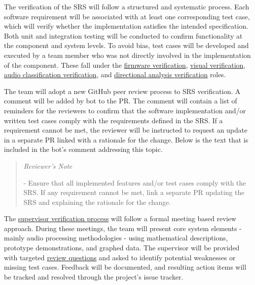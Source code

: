 \documentclass[12pt, titlepage]{article}
\newenvironment{shadedquotation}
    {\begin{quote}\itshape} {\end{quote}}
\begin{document}
The verification of the SRS will follow a structured and systematic process.
Each software requirement will be associated with at least one corresponding
test case, which will verify whether the implementation satisfies the intended
specification. Both unit and integration testing will be conducted to confirm
functionality at the component and system levels. To avoid bias, test cases will
be developed and executed by a team member who was not directly involved in the
implementation of the component. These fall under the
\hyperref[role:firmware_verfication]{firmware verification},
\hyperref[role:visual_vnv]{visual verification},
\hyperref[role:classification_verfication]{audio classification verification},
and
\hyperref[role:directional_verfication]{directional analysis verification}
roles. \newline

The team will adopt a new GitHub peer review process to SRS verification. A
comment will be added by bot to the PR. The comment will contain a list of
reminders for the reviewers to confirm that the software implementation and/or
written test cases comply with the requirements defined in the SRS. If a
requirement cannot be met, the reviewer will be instructed to request an update
in a separate PR linked with a rationale for the change. Below is the text that
is included in the bot's comment addressing this topic. \newline

\begin{shadedquotation}
Reviewer's Note

- Ensure that all implemented features and/or test cases comply with the SRS. If
any requirement cannot be met, link a separate PR updating the SRS and
explaining the rationale for the change.
\end{shadedquotation}

The 
\hyperref[role:audio_processing_verification]{supervisor verification process}
will follow a formal meeting based review approach. During these meetings, the
team will present core system elements - mainly audio processing methodologies -
using mathematical descriptions, prototype demonstrations, and graphed data. The
supervisor will be provided with targeted
\hyperref[questions:supervisor]{review questions}  and asked to identify
potential weaknesses or missing test cases. Feedback will be documented, and
resulting action items will be tracked and resolved through the project's issue
tracker. \newline
\end{document}
